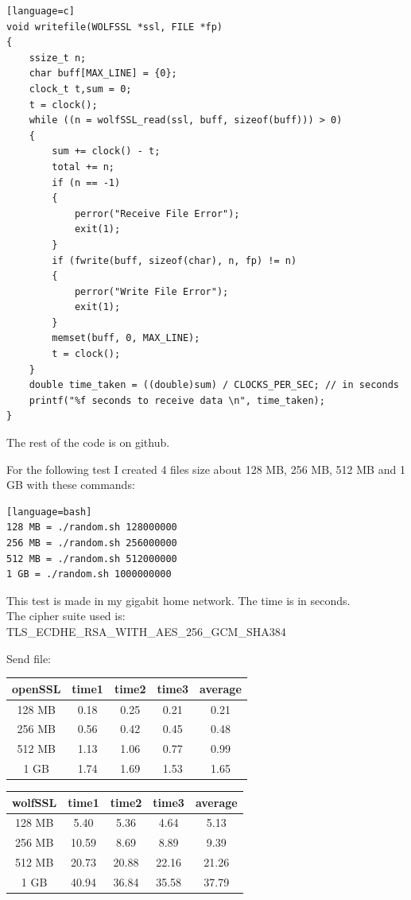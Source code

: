 \documentclass[a4paper,12pt]{article}
\begin{document}
\begin{lstlisting}[caption={writefile wolfSSL function},captionpos=b][language=c]
void writefile(WOLFSSL *ssl, FILE *fp)
{
    ssize_t n;
    char buff[MAX_LINE] = {0};
    clock_t t,sum = 0;
    t = clock();
    while ((n = wolfSSL_read(ssl, buff, sizeof(buff))) > 0)
    {
        sum += clock() - t;
        total += n;
        if (n == -1)
        {
            perror("Receive File Error");
            exit(1);
        }
        if (fwrite(buff, sizeof(char), n, fp) != n)
        {
            perror("Write File Error");
            exit(1);
        }
        memset(buff, 0, MAX_LINE);
        t = clock();
    }
    double time_taken = ((double)sum) / CLOCKS_PER_SEC; // in seconds
    printf("%f seconds to receive data \n", time_taken);
}
\end{lstlisting}
The rest of the code is on github.

For the following test I created 4 files size about 128 MB, 256 MB, 512 MB and 1 GB with these commands:
\begin{lstlisting}[caption={openSSL commands},captionpos=b][language=bash]
128 MB = ./random.sh 128000000
256 MB = ./random.sh 256000000
512 MB = ./random.sh 512000000
1 GB = ./random.sh 1000000000
\end{lstlisting}

This test is made in my gigabit home network.
The time is in seconds.
\\The cipher suite used is: TLS\_ECDHE\_RSA\_WITH\_AES\_256\_GCM\_SHA384

Send file:\\
\begin{tabular}{ ||c|c|c|c|c|| } 
 \hline
 \textbf{openSSL} & time1 & time2 & time3 & average \\ 
 \hline
 128 MB & 0.18& 0.25& 0.21& 0.21\\ 
 \hline
 256 MB & 0.56& 0.42& 0.45& 0.48\\ 
 \hline
 512 MB & 1.13& 1.06& 0.77& 0.99\\ 
 \hline
 1 GB  & 1.74& 1.69& 1.53& 1.65\\ 
 \hline
\end{tabular}
\newline
\begin{tabular}{ ||c|c|c|c|c|| } 
 \hline
 \textbf{wolfSSL} & time1 & time2 & time3 & average \\ 
 \hline
128 MB & 5.40& 5.36& 4.64& 5.13\\ 
 \hline
 256 MB & 10.59& 8.69& 8.89& 9.39\\ 
 \hline
 512 MB & 20.73& 20.88& 22.16& 21.26\\ 
 \hline
 1 GB  & 40.94& 36.84& 35.58& 37.79\\ 
 \hline
\end{tabular}
\newline
\end{document}
